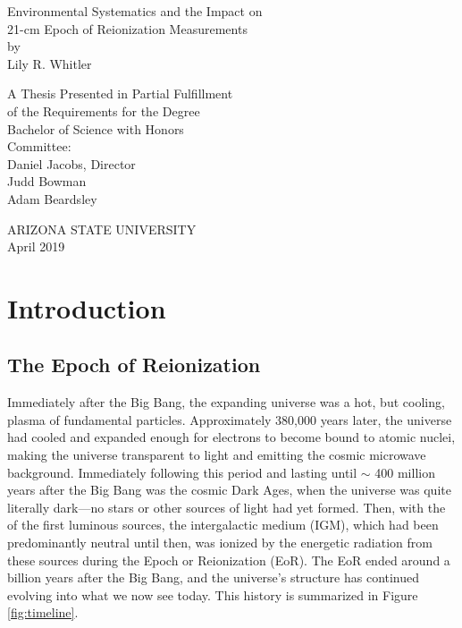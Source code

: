 \documentclass[12pt]{article}
\begin{document}
\begin{center}
	Environmental Systematics and the Impact on \\ 21-cm Epoch of Reionization Measurements \\
	by \\
	Lily R. Whitler
	
	\begin{spacing}{1}
		\vspace{0.15\textheight}
		A Thesis Presented in Partial Fulfillment \\
		of the Requirements for the Degree \\
		Bachelor of Science with Honors \\
		\vspace{0.22\textheight}
		Committee: \\
		Daniel Jacobs, Director \\
		Judd Bowman \\
		Adam Beardsley
	\end{spacing}

	\vspace{0.22\textheight}
	ARIZONA STATE UNIVERSITY \\
	April 2019
\end{center}
\thispagestyle{empty}
\newpage

\begingroup
\hypersetup{
	colorlinks=true,
	citecolor=DarkBlue,
	filecolor=black,
	linkcolor=black,
	urlcolor=DarkBlue
}
\tableofcontents
\listoffigures
\listoftables
\endgroup
\newpage

\begin{abstract}
\end{abstract}
\newpage

\section{Introduction} \label{sec:intro}

\subsection{The Epoch of Reionization} \label{subsec:eor}

Immediately after the Big Bang, the expanding universe was a hot, but cooling, plasma of fundamental particles. Approximately 380,000 years later, the universe had cooled and expanded enough for electrons to become bound to atomic nuclei, making the universe transparent to light and emitting the cosmic microwave background. Immediately following this period and lasting until $\sim$ 400 million years after the Big Bang was the cosmic Dark Ages, when the universe was quite literally dark---no stars or other sources of light had yet formed. Then, with the  of the first luminous sources, the intergalactic medium (IGM), which had been predominantly neutral until then, was ionized by the energetic radiation from these sources during the Epoch or Reionization (EoR). The EoR ended around a billion years after the Big Bang, and the universe's structure has continued evolving into what we now see today. This history is summarized in Figure \ref{fig:timeline}. 
\end{document}
